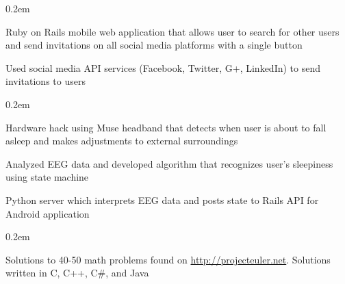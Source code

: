 \documentclass[]{deedy-resume}
\begin{document}
\begin{minipage}[t]{0.66\textwidth}
\begin{tightemize}\itemsep0.2em
\item Ruby on Rails mobile web application that allows user to search for other users and send invitations on all social media platforms with a single button
\item Used social media API services (Facebook, Twitter, G+, LinkedIn) to send invitations to users
\end{tightemize}
\sectionsep

\begin{tightemize}\itemsep0.2em
\item Hardware hack using Muse headband that detects when user is about to fall asleep and makes adjustments to external surroundings
\item Analyzed EEG data and developed algorithm that recognizes user's sleepiness using state machine
\item Python server which interprets EEG data and posts state to Rails API for Android application
\end{tightemize}
\sectionsep

\begin{tightemize}\itemsep0.2em
  \item Solutions to 40-50 math problems found on \href{http://projecteuler.net}{http://projecteuler.net}. Solutions written in C, C++, C\#, and
Java
\end{tightemize}
\sectionsep

\end{minipage}
\end{document}
